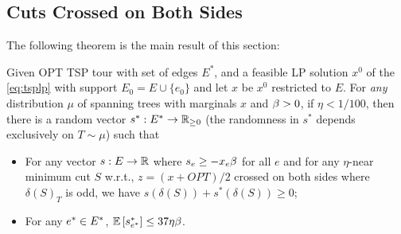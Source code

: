 %

\subsection{Cuts Crossed on Both Sides}\label{sec:crossedBothSides}

The following theorem is the main result of this section:
\begin{theorem}\label{thm:cutsbothsides}
Given OPT TSP tour with set of edges $E^*$, and  a feasible LP solution $x^0$ of the \ref{eq:tsplp} with support $E_0=E\cup \{e_0\}$ and let $x$ be $x^0$ restricted to $E$.  For {\em any} distribution $\mu$ of spanning trees with marginals $x$ and $\beta > 0$, if $\eta <1/100$, then there is a random vector $s^*:E^*\to \mathbb{R}_{\geq 0}$ (the randomness in $s^*$ depends exclusively on $T\sim\mu$) such that 
\begin{itemize}
\item For any vector $s:E\to\mathbb{R}$ where $s_e\geq -x_e \beta$ for all $e$ and for any $\eta$-near minimum cut $S$ w.r.t., $z=(x+OPT)/2$ crossed on both sides where $\delta(S)_T$ is odd, we have
$s(\delta(S))+s^*(\delta(S)) \geq 0$;
\item For any $e^*\in E^*$, ${\mathbb{E}}\left[s^*_{e^*}\right] \leq 37\eta \beta$.
\end{itemize}
\end{theorem}


